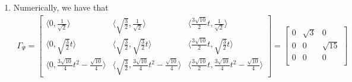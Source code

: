 \documentclass{article}
\begin{document}
\begin{enumerate}[label=(\roman*), resume]
\begin{enumerate}[label=(\alph*)]
    \item Numerically, we have that
    \begin{align}
        \Gamma_\Psi =
        \begin{bmatrix}
            \langle 0,\frac{1}{\sqrt{2}} \rangle & \langle \sqrt{\frac{3}{2}}, \frac{1}{\sqrt{2}} \rangle & \langle \frac{3\sqrt{10}}{2}t ,\frac{1}{\sqrt{2}} \rangle \\
            \langle 0, \sqrt{\frac{3}{2}}t \rangle & \langle\sqrt{\frac{3}{2}}, \sqrt{\frac{3}{2}}t\rangle & \langle \frac{3\sqrt{10}}{2}t, \sqrt{\frac{3}{2}}t \rangle \\
            \langle0, \frac{3\sqrt{10}}{4}  t^2- \frac{\sqrt{10}}{4} \rangle & \langle\sqrt{\frac{3}{2}}, \frac{3\sqrt{10}}{4}  t^2- \frac{\sqrt{10}}{4} \rangle & \langle \frac{3\sqrt{10}}{2}t ,\frac{3\sqrt{10}}{4}  t^2- \frac{\sqrt{10}}{4} \rangle
        \end{bmatrix} = 
        \begin{bmatrix}
            0 & \sqrt{3} & 0 \\
            0 & 0 & \sqrt{15}\\
            0 & 0 & 0 \\
        \end{bmatrix}
    \end{align}
    \end{enumerate}
\end{enumerate}
\end{document}
